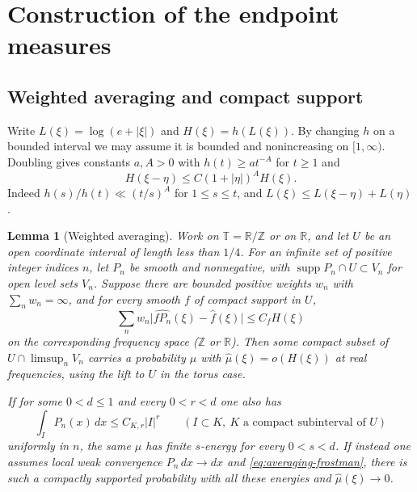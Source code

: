 \documentclass[11pt,a4paper,reqno]{amsart}
\newtheorem{lemma}[theorem]{Lemma}
\theoremstyle{definition}
\theoremstyle{remark}
\numberwithin{equation}{section}
\begin{document}
\section{Construction of the endpoint measures}\label{sec:construction}

\subsection{Weighted averaging and compact support}
Write \(L(\xi)=\log(e+|\xi|)\) and \(H(\xi)=h(L(\xi))\). By changing \(h\) on a bounded interval we may assume it is bounded and nonincreasing on \([1,\infty)\). Doubling gives constants \(a,A>0\) with \(h(t)\ge a t^{-A}\) for \(t\ge1\) and
\begin{equation}\label{eq:gauge-shifts}
  H(\xi-\eta)\le C(1+|\eta|)^A H(\xi).
\end{equation}
Indeed \(h(s)/h(t)\ll(t/s)^A\) for \(1\le s\le t\), and \(L(\xi)\le L(\xi-\eta)+L(\eta)\).

\begin{lemma}[Weighted averaging]\label{lem:averaging}
Work on \(\mathbb T=\mathbb R/\mathbb Z\) or on \(\mathbb R\), and let \(U\) be an open coordinate interval of length less than \(1/4\). For an infinite set of positive integer indices \(n\), let \(P_n\) be smooth and nonnegative, with \(\operatorname{supp}P_n\cap U\subset V_n\) for open level sets \(V_n\). Suppose there are bounded positive weights \(w_n\) with \(\sum_n w_n=\infty\), and for every smooth \(f\) of compact support in \(U\),
\begin{equation}\label{eq:localized-averaging}
  \sum_n w_n\big|\widehat{fP_n}(\xi)-\widehat f(\xi)\big|\le C_f H(\xi)
\end{equation}
on the corresponding frequency space (\(\mathbb Z\) or \(\mathbb R\)). Then some compact subset of \(U\cap\limsup_n V_n\) carries a probability \(\mu\) with \(\widehat\mu(\xi)=o(H(\xi))\) at real frequencies, using the lift to \(U\) in the torus case.

If for some \(0<d\le1\) and every \(0<r<d\) one also has
\begin{equation}\label{eq:averaging-frostman}
  \int_I P_n(x)\,dx\le C_{K,r}|I|^r
  \qquad (I\subset K,\ K\text{ a compact subinterval of }U)
\end{equation}
uniformly in \(n\), the same \(\mu\) has finite \(s\)-energy for every \(0<s<d\). If instead one assumes local weak convergence \(P_n\,dx\to dx\) and \eqref{eq:averaging-frostman}, there is such a compactly supported probability with all these energies and \(\widehat\mu(\xi)\to0\).
\end{lemma}
\end{document}
